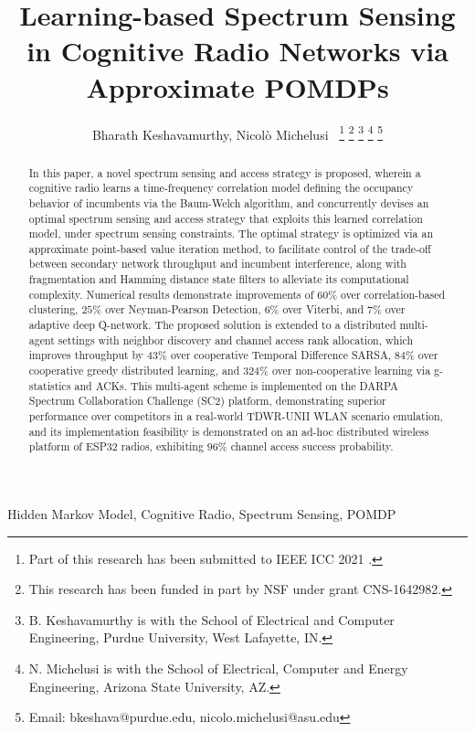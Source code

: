 \documentclass[12pt, draftcls, onecolumn]{IEEEtran}
\title{Learning-based Spectrum Sensing in Cognitive Radio Networks via Approximate POMDPs}
\author{Bharath Keshavamurthy, Nicol\`{o} Michelusi~\IEEEmembership{Senior Member,~IEEE}
\thanks{Part of this research has been submitted to IEEE ICC 2021 \cite{ICC:paper}.}
\thanks{This research has been funded in part by NSF under grant CNS-1642982.}
\thanks{B. Keshavamurthy is with the School of Electrical and Computer Engineering, Purdue University, West Lafayette, IN.}
\thanks{N. Michelusi is with the School of Electrical, Computer and Energy Engineering, Arizona State University, AZ.}
\thanks{Email: bkeshava@purdue.edu, nicolo.michelusi@asu.edu}

\vspace{-12mm}}
\begin{document}
\maketitle
\thispagestyle{plain}
\pagestyle{plain} 

\begin{abstract}
In this paper, a novel spectrum sensing and access strategy is proposed, wherein a cognitive radio learns a time-frequency correlation model defining the occupancy behavior of incumbents via the Baum-Welch algorithm, and concurrently devises an optimal spectrum sensing and access strategy that exploits this learned correlation model, under spectrum sensing constraints. The optimal strategy is optimized via an approximate point-based value iteration method,
to facilitate control of the trade-off between secondary network throughput and incumbent interference,
 along with fragmentation and Hamming distance state filters to alleviate its computational complexity. Numerical results demonstrate improvements of $60$\%  over correlation-based clustering, $25$\% over Neyman-Pearson Detection, $6$\%  over Viterbi, and $7$\% over adaptive deep Q-network. The proposed solution is extended to a distributed multi-agent settings with neighbor discovery and channel access rank allocation, which improves throughput by $43$\%  over cooperative Temporal Difference SARSA, $84$\% over cooperative greedy distributed learning, and $324$\% over non-cooperative learning via g-statistics and ACKs. This multi-agent scheme is implemented 
on the DARPA Spectrum Collaboration Challenge (SC2) platform, demonstrating superior performance over competitors in a real-world TDWR-UNII WLAN scenario emulation,
and its implementation feasibility is demonstrated on an ad-hoc distributed wireless platform of ESP32 radios, exhibiting $96$\% channel access success probability.
\end{abstract}

\begin{IEEEkeywords}
Hidden Markov Model, Cognitive Radio, Spectrum Sensing, POMDP
\end{IEEEkeywords}
\end{document}
